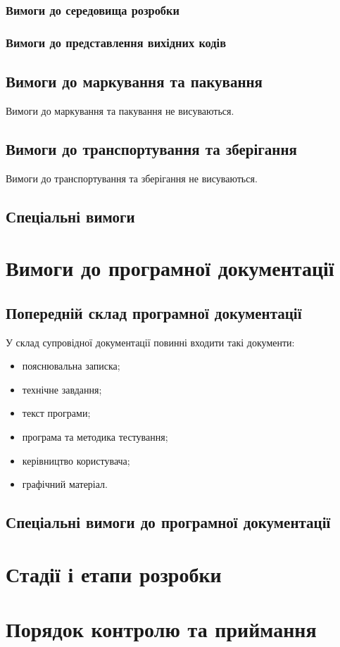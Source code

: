 \documentclass{kpi-thesis}
\begin{document}
\subsubsection{Вимоги до середовища розробки}
\subsubsection{Вимоги до представлення вихідних кодів}

\subsection{Вимоги до маркування та пакування}
Вимоги до маркування та пакування не висуваються.

\subsection{Вимоги до транспортування та зберігання}
Вимоги до транспортування та зберігання не висуваються.

\subsection{Спеціальні вимоги}

\section{Вимоги до програмної документації}
\subsection{Попередній склад програмної документації}
У склад супровідної документації повинні входити такі документи:
\begin{itemize}
\item пояснювальна записка;
\item технічне завдання;
\item текст програми;
\item програма та методика тестування;
\item керівництво користувача;
\item графічний матеріал.
\end{itemize}

\subsection{Спеціальні вимоги до програмної документації}

\section{Стадії і етапи розробки}

\section{Порядок контролю та приймання}
\end{document}
